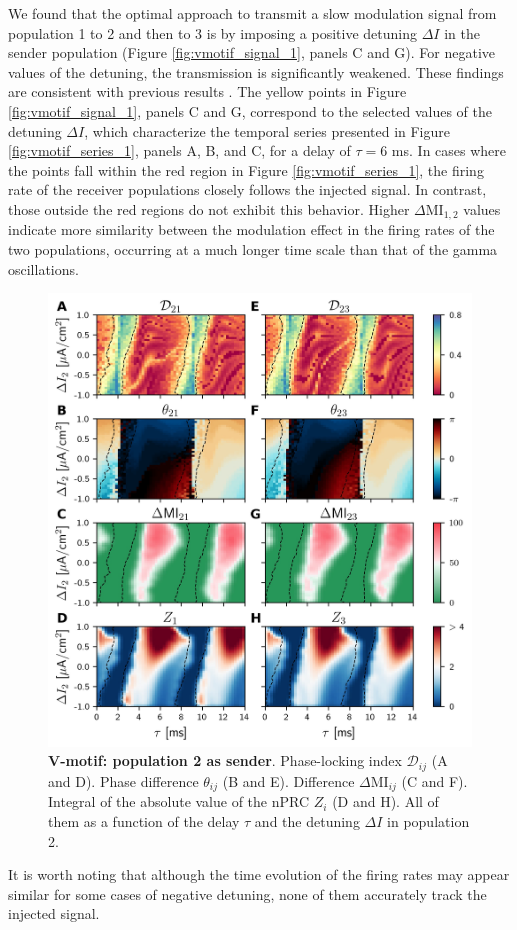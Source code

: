 \documentclass[../main.tex]{subfiles}
\begin{document}
We found that the optimal approach to transmit a slow modulation signal from population 1 to 2 and then to 3 is by imposing a positive detuning $\Delta I$ in the sender population (Figure \ref{fig:vmotif_signal_1}, panels C and G).
For negative values of the detuning, the transmission is significantly weakened.
These findings are consistent with previous results \cite{pariz_high_2018,pariz_transmission_2021}.
The yellow points in Figure \ref{fig:vmotif_signal_1}, panels C and G, correspond to the selected values of the detuning $\Delta I$, which characterize the temporal series presented in Figure \ref{fig:vmotif_series_1}, panels A, B, and C, for a delay of $\tau = 6$ ms.
In cases where the points fall within the red region in Figure \ref{fig:vmotif_series_1}, the firing rate of the receiver populations closely follows the injected signal.
In contrast, those outside the red regions do not exhibit this behavior.
Higher $\Delta$MI$_{1,2}$ values indicate more similarity between the modulation effect in the firing rates of the two populations, occurring at a much longer time scale than that of the gamma oscillations.
\begin{figure}[!htb]
 \centering
    \includegraphics[width=\textwidth]{chapter2/figures/fig4}
    \caption{\textbf{V-motif: population 2 as sender}.
    Phase-locking index $\mathcal{D}_{ij}$ (A and D).
    Phase difference $\theta_{ij}$ (B and E).
    Difference $\Delta$MI$_{ij}$ (C and F).
    Integral of the absolute value of the nPRC $Z_i$ (D and H).
    All of them as a function of the delay $\tau$ and the detuning $\Delta I$ in population 2.}
    \label{fig:vmotif_signal_2}
\end{figure}
It is worth noting that although the time evolution of the firing rates may appear similar for some cases of negative detuning, none of them accurately track the injected signal.
\end{document}
